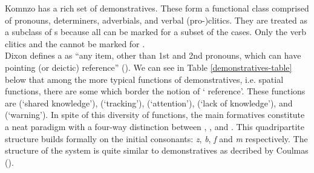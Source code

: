 Komnzo has a rich set of demonstratives. These form a functional class comprised of pronouns, determiners, adverbials, and verbal (pro-)clitics. They are treated as a subclass of s because all can be marked for a subset of the cases. Only the verb clitics and the   cannot be marked for .\\

Dixon defines a  as ``any item, other than 1st and 2nd pronouns, which can have pointing (or deictic) reference'' (\citeyear[61-62]{Dixon:2003dj}). We can see in Table \ref{demonstratives-table} below that among the more typical functions of demonstratives, i.e. spatial functions, there are some which border the notion of ` reference'. These functions are  (`shared knowledge'),  (`tracking'),  (`attention'),  (`lack of knowledge'), and  (`warning'). In spite of this diversity of functions, the main formatives constitute a neat paradigm with a four-way distinction between , ,  and . This quadripartite structure builds formally on the initial consonants: \emph{z}, \emph{b}, \emph{f} and \emph{m} respectively. The structure of the system is quite similar to  demonstratives as decribed by Coulmas (\citeyear{Coulmas:1982wl}).\\

